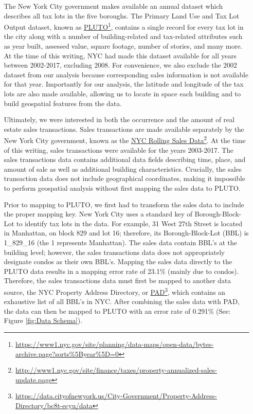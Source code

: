 \documentclass[12pt,]{article}
\let\rmarkdownfootnote\footnote%
\def\footnote{\protect\rmarkdownfootnote}
\begin{document}
The New York City government makes available an annual dataset which
describes all tax lots in the five boroughs. The Primary Land Use and
Tax Lot Output dataset, known as
\href{https://www1.nyc.gov/site/planning/data-maps/open-data/bytes-archive.page?sorts\%5Byear\%5D=0}{PLUTO}\footnote{\url{https://www1.nyc.gov/site/planning/data-maps/open-data/bytes-archive.page?sorts\%5Byear\%5D=0}},
contains a single record for every tax lot in the city along with a
number of building-related and tax-related attributes such as year
built, assessed value, square footage, number of stories, and many more.
At the time of this writing, NYC had made this dataset available for all
years between 2002-2017, excluding 2008. For convenience, we also
exclude the 2002 dataset from our analysis because corresponding sales
information is not available for that year. Importantly for our
analysis, the latitude and longitude of the tax lots are also made
available, allowing us to locate in space each building and to build
geospatial features from the data.

Ultimately, we were interested in both the occurrence and the amount of
real estate sales transactions. Sales transactions are made available
separately by the New York City government, known as the
\href{http://www1.nyc.gov/site/finance/taxes/property-annualized-sales-update.page}{NYC
Rolling Sales Data}\footnote{\url{http://www1.nyc.gov/site/finance/taxes/property-annualized-sales-update.page}}.
At the time of this writing, sales transactions were available for the
years 2003-2017. The sales transactions data contains additional data
fields describing time, place, and amount of sale as well as additional
building characteristics. Crucially, the sales transaction data does not
include geographical coordinates, making it impossible to perform
geospatial analysis without first mapping the sales data to PLUTO.

Prior to mapping to PLUTO, we first had to transform the sales data to
include the proper mapping key. New York City uses a standard key of
Borough-Block-Lot to identify tax lots in the data. For example, 31 West
27th Street is located in Manhattan, on block 829 and lot 16; therefore,
its Borough-Block-Lot (BBL) is 1\_829\_16 (the 1 represents Manhattan).
The sales data contain BBL's at the building level; however, the sales
transactions data does not appropriately designate condos as their own
BBL's. Mapping the sales data directly to the PLUTO data results in a
mapping error rate of 23.1\% (mainly due to condos). Therefore, the
sales transactions data must first be mapped to another data source, the
NYC Property Address Directory, or
\href{https://data.cityofnewyork.us/City-Government/Property-Address-Directory/bc8t-ecyu/data}{PAD}\footnote{\url{https://data.cityofnewyork.us/City-Government/Property-Address-Directory/bc8t-ecyu/data}},
which contains an exhaustive list of all BBL's in NYC. After combining
the sales data with PAD, the data can then be mapped to PLUTO with an
error rate of 0.291\% (See: Figure \ref{fig:Data Schema}).
\end{document}
